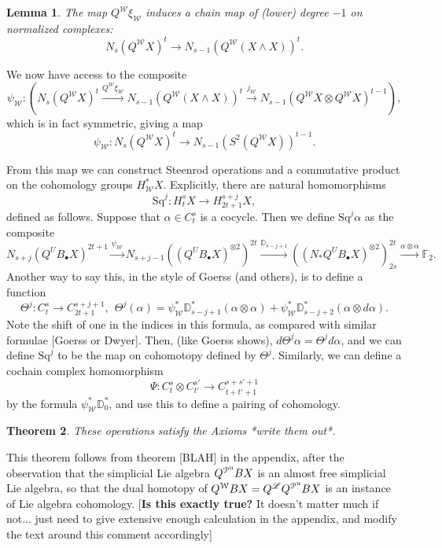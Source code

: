\documentclass[11pt]{amsart}
\theoremstyle{plain}
\newtheorem{thm}{Theorem}[section]
\newtheorem{lem}[thm]{Lemma}
\theoremstyle{definition}
\renewcommand{\to}{\longrightarrow}
\newcommand{\scrL}{\mathscr{L}}
\newcommand{\calW}{\mathcal{W}}
\newcommand{\calP}{\mathcal{P}}
\newcommand{\calV}{\mathcal{V}}
\theoremstyle{plain}
\newcommand{\PMonad}{{\calP^\textup{u}}}
\newcommand{\Palg}{{\calP}}
\newcommand{\LieOperad}{{\scrL}}
\newcommand{\vect}[2]{\calV^{#1}_{#2}}
\newcommand{\Sq}{\mathrm{Sq}}
\newcommand{\F}{\mathbb{F}}
\begin{document}
\begin{Cohomology operations for unstable Lie algebras over P}
{\begin{lem}
The map $Q^\calW\xi_\calW$ induces a chain map of (lower) degree $-1$ on normalized complexes:
\[N_s(Q^{\calW}X)^t\to N_{s-1}(Q^{\calW}(X\wedge X))^t.\]
\end{lem}
We now have access to the composite
\[\psi_\calW:\left(N_s(Q^{\calW}X)^t\overset{Q^\calW\xi_\calW}{\to} N_{s-1}(Q^{\calW}(X\wedge X))^t\overset{j_\calW}{\to} N_{s-1}(Q^{\calW}X\otimes Q^\calW X)^{t-1}\right),\]
which is in fact symmetric, giving a map
\[\psi_{\calW}:N_s(Q^{\calW}X)^t\to N_{s-1}(S^2(Q^{\calW}X))^{t-1}.\]

From this map we can construct Steenrod operations and a commutative product on the cohomology groups $H^*_\calW X$. Explicitly, there are natural homomorphisms
\[\Sq^j:H_t^{s}X\to H_{2t+1}^{s+j}X,\]
defined as follows. Suppose that $\alpha\in C_t^{s}$ is a cocycle. Then we define $\Sq^j\alpha$ as the composite
\[N_{s+j}(Q^UB_{\bullet}X)^{2t+1}\overset{\psi_\calW}{\to}N_{s+j-1}((Q^UB_{\bullet}X)^{\otimes2})^{2t}\overset{\mathbb{D}_{s-j+1}}{\to}
((N_*Q^UB_{\bullet}X)^{\otimes2})^{2t}_{2s} \overset{\alpha\otimes\alpha}{\to}\F_2.
\]
Another way to say this, in the style of Goerss (and others), is to define a function
\[\Theta^j:C_{t}^{s}\to C_{2t+1}^{s+j+1},\ \ \Theta^j(\alpha)=\psi^*_\calW\mathbb{D}_{s-j+1}^*(\alpha\otimes\alpha)+ \psi^*_\calW\mathbb{D}_{s-j+2}^*(\alpha\otimes d\alpha).\]
Note the shift of one in the indices in this formula, as compared with similar formulae [Goerss or Dwyer].
Then, (like Goerss shows), $d\Theta^j\alpha=\Theta^jd\alpha$, and we can define $\Sq^j$ to be the map on cohomotopy defined by $\Theta^j$. Similarly, we can define a cochain complex homomorphism
\[\Psi:C_t^{s}\otimes C_{t'}^{s'}\to C_{t+t'+1}^{s+s'+1}\]
by the formula $\psi^*_\calW\mathbb{D}_0^*$, and use this to define a pairing of cohomology.}
\begin{thm}
These operations satisfy the Axioms *write them out*.
\end{thm}
This theorem follows from theorem [BLAH] in the appendix, after the observation that 
the simplicial Lie algebra $Q^\PMonad B X$ is an almost free simplicial Lie algebra, so that the dual homotopy of $Q^\calW B X=Q^{\LieOperad} Q^\PMonad B X$ is an instance of Lie algebra cohomology. [\textbf{Is this exactly true?} It doesn't matter much if not... just need to give extensive enough calculation in the appendix, and modify the text around this comment accordingly]


\end{Cohomology operations for unstable Lie algebras over P}
\end{document}
